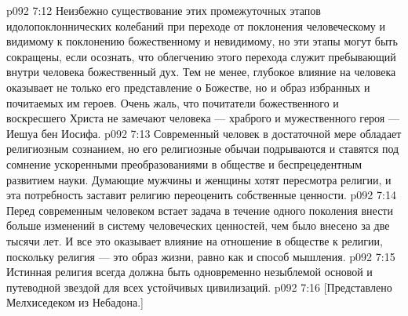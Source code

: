 \vs p092 7:12 Неизбежно существование этих промежуточных этапов идолопоклоннических колебаний при переходе от поклонения человеческому и видимому к поклонению божественному и невидимому, но эти этапы могут быть сокращены, если осознать, что облегчению этого перехода служит пребывающий внутри человека божественный дух. Тем не менее, глубокое влияние на человека оказывает не только его представление о Божестве, но и образ избранных и почитаемых им героев. Очень жаль, что почитатели божественного и воскресшего Христа не замечают человека --- храброго и мужественного героя --- Иешуа бен Иосифа.
\vs p092 7:13 \pc Современный человек в достаточной мере обладает религиозным сознанием, но его религиозные обычаи подрываются и ставятся под сомнение ускоренными преобразованиями в обществе и беспрецедентным развитием науки. Думающие мужчины и женщины хотят пересмотра религии, и эта потребность заставит религию переоценить собственные ценности.
\vs p092 7:14 Перед современным человеком встает задача в течение одного поколения внести больше изменений в систему человеческих ценностей, чем было внесено за две тысячи лет. И все это оказывает влияние на отношение в обществе к религии, поскольку религия --- это образ жизни, равно как и способ мышления.
\vs p092 7:15 \pc Истинная религия всегда должна быть одновременно незыблемой основой и путеводной звездой для всех устойчивых цивилизаций.
\vsetoff
\vs p092 7:16 [Представлено Мелхиседеком из Небадона.]
